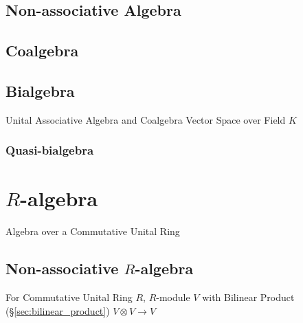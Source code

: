 \subsection{Non-associative Algebra}
\label{sec:nonassociative_algebra}

\subsection{Coalgebra}\label{sec:coalgebra}

\subsection{Bialgebra}\label{sec:bialgebra}

Unital Associative Algebra and Coalgebra Vector Space over Field $K$



\subsubsection{Quasi-bialgebra}\label{sec:quasi_bialgebra}



\section{$R$-algebra}\label{sec:r_algebra}

Algebra over a Commutative Unital Ring



\subsection{Non-associative $R$-algebra}
\label{sec:nonassociative_r_algebra}

For Commutative Unital Ring $R$, $R$-module $V$ with Bilinear Product
(\S\ref{sec:bilinear_product}) $V \otimes V \rightarrow V$



